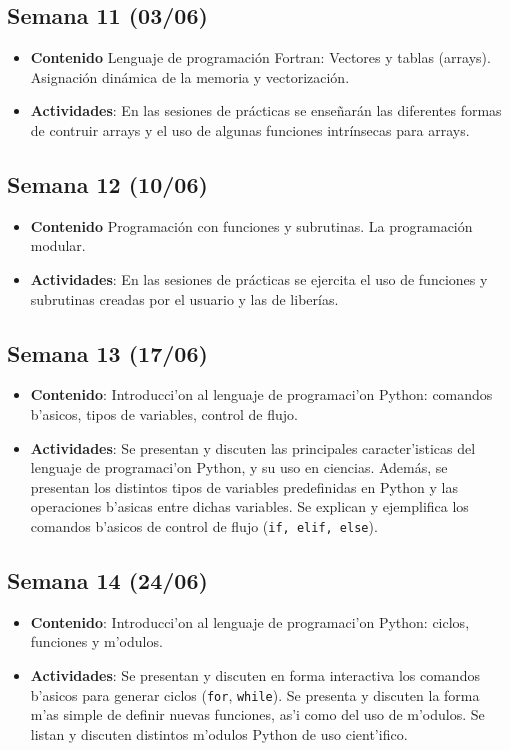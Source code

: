 \documentclass[letterpaper,11pt]{exam}
\begin{document}
\begin{multicols}{2}
\begin{scriptsize}
\subsection*{Semana 11 (03/06)}
\begin{itemize}
\item \textbf{Contenido} Lenguaje de programación Fortran: Vectores y tablas (arrays). Asignación dinámica de la memoria y vectorización.
\item \textbf{Actividades}: En las sesiones de prácticas se enseñarán las diferentes formas de contruir arrays y el uso de algunas funciones intrínsecas para arrays.
\end{itemize}

\subsection*{Semana 12 (10/06)}
\begin{itemize}
\item \textbf{Contenido} Programación con funciones y subrutinas. La programación modular.  
\item \textbf{Actividades}: En las sesiones de prácticas se ejercita el uso de funciones y subrutinas creadas por el usuario y las de liberías.
\end{itemize}

\subsection*{Semana 13 (17/06)}
\begin{itemize}
\item \textbf{Contenido}: Introducci'on al lenguaje de programaci'on Python: comandos b'asicos, tipos de variables, control de flujo.
\item \textbf{Actividades}: Se presentan y discuten las principales caracter'isticas del lenguaje de programaci'on Python, y su uso en ciencias. Además, se presentan los distintos tipos de variables predefinidas en Python y las operaciones b'asicas entre dichas variables. Se explican y ejemplifica los comandos b'asicos de control de flujo (\texttt{if, elif, else}).
\end{itemize}

\subsection*{Semana 14 (24/06)}
\begin{itemize}
\item \textbf{Contenido}: Introducci'on al lenguaje de programaci'on Python: ciclos, funciones y m'odulos.
\item \textbf{Actividades}: Se presentan y discuten en forma interactiva los comandos b'asicos para generar ciclos (\texttt{for}, \texttt{while}). Se presenta y discuten la forma m'as simple de definir nuevas funciones, as'i como del uso de m'odulos. Se listan y discuten distintos m'odulos Python de uso cient'ifico.
\end{itemize}


\end{scriptsize}
\end{multicols}
\end{document}
